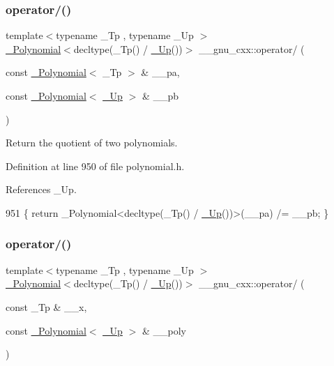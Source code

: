\subsubsection{\texorpdfstring{operator/()}{operator/()}\hspace{0.1cm}{\footnotesize\ttfamily [4/5]}}
{\footnotesize\ttfamily template$<$typename \+\_\+\+Tp , typename \+\_\+\+Up $>$ \\
\hyperlink{class____gnu__cxx_1_1__Polynomial}{\+\_\+\+Polynomial}$<$decltype(\+\_\+\+Tp() / \hyperlink{namespace____gnu__cxx_ab693ea357b6429b331e0bf09f9442385}{\+\_\+\+Up}())$>$ \+\_\+\+\_\+gnu\+\_\+cxx\+::operator/ (\begin{DoxyParamCaption}\item[{const \hyperlink{class____gnu__cxx_1_1__Polynomial}{\+\_\+\+Polynomial}$<$ \+\_\+\+Tp $>$ \&}]{\+\_\+\+\_\+pa,  }\item[{const \hyperlink{class____gnu__cxx_1_1__Polynomial}{\+\_\+\+Polynomial}$<$ \hyperlink{namespace____gnu__cxx_ab693ea357b6429b331e0bf09f9442385}{\+\_\+\+Up} $>$ \&}]{\+\_\+\+\_\+pb }\end{DoxyParamCaption})\hspace{0.3cm}{\ttfamily [inline]}}

Return the quotient of two polynomials. 

Definition at line 950 of file polynomial.\+h.



References \+\_\+\+Up.


\begin{DoxyCode}
951     \{ \textcolor{keywordflow}{return} \_Polynomial<decltype(\_Tp() / \hyperlink{namespace____gnu__cxx_ab693ea357b6429b331e0bf09f9442385}{\_Up}())>(\_\_pa) /= \_\_pb; \}
\end{DoxyCode}
\mbox{\label{namespace____gnu__cxx_a4c1b4c46ffc6c41fb5b5d1a4293ca563}} 
\subsubsection{\texorpdfstring{operator/()}{operator/()}\hspace{0.1cm}{\footnotesize\ttfamily [5/5]}}
{\footnotesize\ttfamily template$<$typename \+\_\+\+Tp , typename \+\_\+\+Up $>$ \\
\hyperlink{class____gnu__cxx_1_1__Polynomial}{\+\_\+\+Polynomial}$<$decltype(\+\_\+\+Tp() / \hyperlink{namespace____gnu__cxx_ab693ea357b6429b331e0bf09f9442385}{\+\_\+\+Up}())$>$ \+\_\+\+\_\+gnu\+\_\+cxx\+::operator/ (\begin{DoxyParamCaption}\item[{const \+\_\+\+Tp \&}]{\+\_\+\+\_\+x,  }\item[{const \hyperlink{class____gnu__cxx_1_1__Polynomial}{\+\_\+\+Polynomial}$<$ \hyperlink{namespace____gnu__cxx_ab693ea357b6429b331e0bf09f9442385}{\+\_\+\+Up} $>$ \&}]{\+\_\+\+\_\+poly }\end{DoxyParamCaption})\hspace{0.3cm}{\ttfamily [inline]}}

